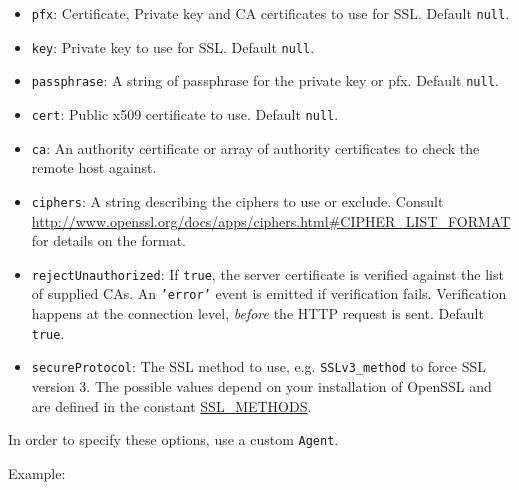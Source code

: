 \begin{itemize}
\item
  \texttt{pfx}: Certificate, Private key and CA certificates to use for
  SSL. Default \texttt{null}.
\item
  \texttt{key}: Private key to use for SSL. Default \texttt{null}.
\item
  \texttt{passphrase}: A string of passphrase for the private key or
  pfx. Default \texttt{null}.
\item
  \texttt{cert}: Public x509 certificate to use. Default \texttt{null}.
\item
  \texttt{ca}: An authority certificate or array of authority
  certificates to check the remote host against.
\item
  \texttt{ciphers}: A string describing the ciphers to use or exclude.
  Consult
  \url{http://www.openssl.org/docs/apps/ciphers.html#CIPHER_LIST_FORMAT}
  for details on the format.
\item
  \texttt{rejectUnauthorized}: If \texttt{true}, the server certificate
  is verified against the list of supplied CAs. An \texttt{'error'}
  event is emitted if verification fails. Verification happens at the
  connection level, \emph{before} the HTTP request is sent. Default
  \texttt{true}.
\item
  \texttt{secureProtocol}: The SSL method to use, e.g.
  \texttt{SSLv3\_method} to force SSL version 3. The possible values
  depend on your installation of OpenSSL and are defined in the constant
  \href{http://www.openssl.org/docs/ssl/ssl.html\#DEALING\_WITH\_PROTOCOL\_METHODS}{SSL\_METHODS}.
\end{itemize}

In order to specify these options, use a custom \texttt{Agent}.

Example:

\begin{Shaded}
\begin{Highlighting}[]
 
  \NormalTok{: }\NormalTok{,}
  \NormalTok{: }\NormalTok{,}
  \NormalTok{: }\NormalTok{,}
  \NormalTok{: }\NormalTok{,}
  \NormalTok{: }\NormalTok{(}\NormalTok{),}
  \NormalTok{: }\NormalTok{(}\NormalTok{)}
\NormalTok{\};}
 \NormalTok{= } 

 
\NormalTok{\}}
\end{Highlighting}
\end{Shaded}

